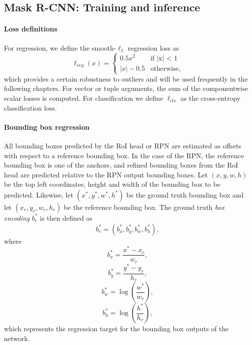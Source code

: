 \subsection{Mask R-CNN: Training and inference}
\paragraph{Loss definitions}
For regression, we define the smooth-$\ell_1$ regression loss as
\begin{equation}
\ell_{reg}(x) =
\begin{cases}
0.5x^2 &\text{if |x| < 1} \\
|x| - 0.5 &\text{otherwise,}
\end{cases}
\end{equation}
which provides a certain robustness to outliers and will be used
frequently in the following chapters. For vector or tuple arguments, the sum of the componentwise scalar
losses is computed.
For classification we define $\ell_{cls}$ as the cross-entropy classification loss.


\label{ssec:rcnn_techn}
\paragraph{Bounding box regression}
All bounding boxes predicted by the RoI head or RPN are estimated as offsets
with respect to a reference bounding box. In the case of the RPN,
the reference bounding box is one of the anchors, and refined bounding boxes from the RoI head are
predicted relative to the RPN output bounding boxes.
Let $(x, y, w, h)$ be the top left coordinates, height and width of the bounding box
to be predicted. Likewise, let $(x^*, y^*, w^*, h^*)$ be the ground truth bounding
box and let $(x_r, y_r, w_r, h_r)$ be the reference bounding box.
The ground truth \emph{box encoding} $b_e^*$ is then defined as
\begin{equation}
b_e^* = (b_x^*, b_y^*, b_w^*, b_h^*),
\end{equation}
where
\begin{equation*}
b_x^* = \frac{x^* - x_r}{w_r},
\end{equation*}
\begin{equation*}
b_y^* = \frac{y^* - y_r}{h_r},
\end{equation*}
\begin{equation*}
b_w^* = \log \left( \frac{w^*}{w_r} \right),
\end{equation*}
\begin{equation*}
b_h^* = \log \left( \frac{h^*}{h_r} \right),
\end{equation*}
which represents the regression target for the bounding box
outputs of the network.

